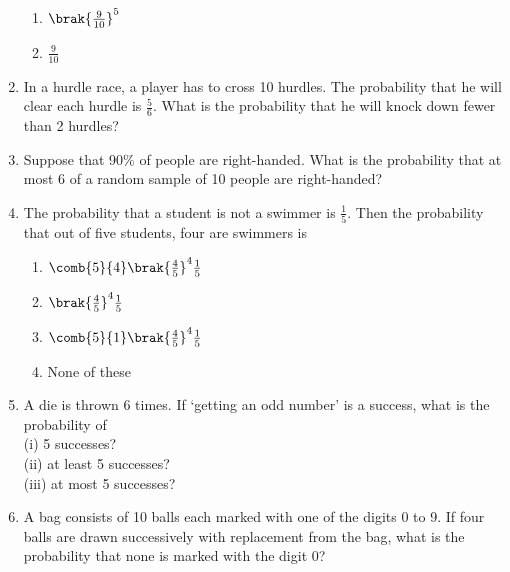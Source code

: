 \begin{enumerate}[label=\thesection.\arabic*.,ref=\thesection.\theenumi]
\begin{enumerate}
\item $\brak{\frac{9}{10}}^5$
\item $\frac{9}{10}$
\end{enumerate}
%
\solution

\item In a hurdle race, a player has to cross 10 hurdles. The probability that he will
clear each hurdle is $\frac{5}{6}$. What is the probability that he will knock down fewer than 2 hurdles?\\
\solution 

\item Suppose that 90$\%$ of people are right-handed. What is the probability that
at most 6 of a random sample of 10 people are right-handed?\\
\solution

\item The probability that a student is not a swimmer is $\frac{1}{5}$. Then the probability that out of five students, four are swimmers is\\
\begin{enumerate}
\item $\comb{5}{4}\brak{\frac{4}{5}}^4 \frac{1}{5}$
\item $\brak{\frac{4}{5}}^4 \frac{1}{5}$
\item $\comb{5}{1}\brak{\frac{4}{5}}^4 \frac{1}{5}$
\item None of these
\end{enumerate}
\solution

%
\item A die is thrown 6 times. If ‘getting an odd number’ is a success, what is the probability of\\
(i) 5 successes?\\
(ii) at least 5 successes?\\
(iii) at most 5 successes?\\
%
\solution

\item A bag consists of 10 balls each marked with one of the digits 0 to 9. If four balls are drawn successively with replacement from the bag, what is the probability that none is marked with the digit 0?\\
\solution



\end{enumerate}


